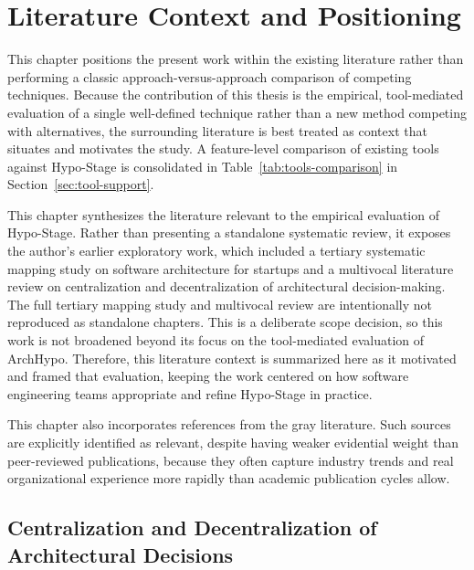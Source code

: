 
\chapter{Literature Context and Positioning}
\label{cap:related-work}
\label{chap:related-work}

This chapter positions the present work within the existing literature rather than
performing a classic approach-versus-approach comparison of competing techniques.
Because the contribution of this thesis is the empirical, tool-mediated evaluation of a
single well-defined technique rather than a new method competing with alternatives, the surrounding literature is best treated as
context that situates and motivates the study. A feature-level comparison of existing tools against Hypo-Stage is consolidated in
Table~\ref{tab:tools-comparison} in Section~\ref{sec:tool-support}.

This chapter synthesizes the literature relevant to the empirical evaluation of Hypo-Stage. 
Rather than presenting a standalone systematic review, it exposes the author's earlier exploratory work, which included a tertiary systematic
mapping study on software architecture for startups and a multivocal literature review
on centralization and decentralization of architectural decision-making. The full tertiary mapping study and multivocal review are intentionally not reproduced as
standalone chapters. This is a deliberate scope decision, so this work is not broadened beyond its focus on the
tool-mediated evaluation of ArchHypo. Therefore, this literature context is summarized here as it motivated and framed that evaluation, keeping the
work centered on how software engineering teams appropriate and refine Hypo-Stage in
practice. 

This chapter also incorporates references from the gray literature. Such sources
are explicitly identified as relevant, despite having weaker evidential
weight than peer-reviewed publications, because they often capture industry trends and real
organizational experience more rapidly than academic publication cycles allow.

\section{Centralization and Decentralization of Architectural Decisions}
\label{sec:central-decentral}


